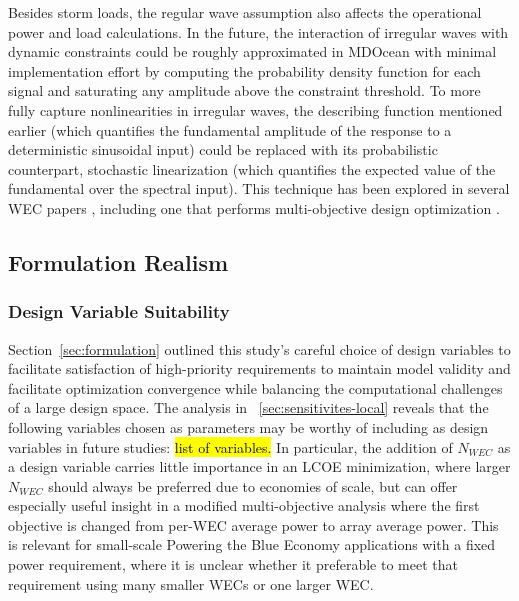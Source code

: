 Besides storm loads, the regular wave assumption also affects the operational power and load calculations.
In the future, the interaction of irregular waves with dynamic constraints could be roughly approximated in MDOcean with minimal implementation effort by computing the probability density function for each signal and saturating any amplitude above the constraint threshold.
To more fully capture nonlinearities in irregular waves, the describing function mentioned earlier (which quantifies the fundamental amplitude of the response to a deterministic sinusoidal input) could be replaced with its probabilistic counterpart, stochastic linearization (which quantifies the expected value of the fundamental over the spectral input).
This technique has been explored in several WEC papers \cite{da_silva_statistical_2020,da_silva_stochastic_2023,kluger_synergistic_2017,folley_spectral-domain_2016,spanos_efficient_2016}, including one that performs multi-objective design optimization \cite{neshat_enhancing_2024}.


\subsection{Formulation Realism}
\subsubsection{Design Variable Suitability}
Section~\ref{sec:formulation} outlined this study's careful choice of design variables to facilitate satisfaction of high-priority requirements to maintain model validity and facilitate optimization convergence while balancing the computational challenges of a large design space.
The analysis in \sectionautorefname~\ref{sec:sensitivites-local} reveals that the following variables chosen as parameters may be worthy of including as design variables in future studies: \hl{list of variables.} In particular, the addition of $N_{WEC}$ as a design variable carries little importance in an LCOE minimization, where larger $N_{WEC}$ should always be preferred due to economies of scale, but can offer especially useful insight in a modified multi-objective analysis where the first objective is changed from per-WEC average power to array average power.
This is relevant for small-scale Powering the Blue Economy applications with a fixed power requirement, where it is unclear whether it preferable to meet that requirement using many smaller WECs or one larger WEC.

